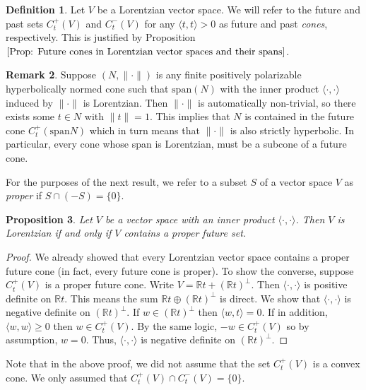 \documentclass[a4paper,11pt]{article}
\numberwithin{equation}{section}
\theoremstyle{definition}
\newtheorem{Definition}{Definition}[section]
\newtheorem{Remark}[Definition]{Remark}
\theoremstyle{plain}
\newtheorem{Proposition}[Definition]{Proposition}
\newcommand{\R}{\mathbb R}
\newcommand{\spn}{\mathrm{span}}
\newcommand{\inner}[2]{\langle #1, #2 \rangle}
\newcommand{\norm}[1]{\| #1\|}
\begin{document}
\begin{Definition}
    Let $V$ be a Lorentzian vector space. We will refer to the future and past sets $C^{+}_t(V)$ and $C^{-}_{t}(V)$ for any $\inner{t}{t} > 0$ as future and past \textit{cones}, respectively. This is justified by Proposition $\ref{Prop: Future cones in Lorentzian vector spaces and their spans}$.
\end{Definition}

\begin{Remark}
    Suppose $(N, \norm{\cdot})$ is any finite positively polarizable hyperbolically normed cone such that $\spn(N)$ with the inner product $\inner{\cdot}{\cdot}$ induced by $\norm{\cdot}$ is Lorentzian. Then $\norm{\cdot}$ is automatically non-trivial, so there exists some $t \in N$ with $\norm{t} = 1$. This implies that $N$ is contained in the future cone $C_{t}^{+}(\spn N)$ which in turn means that $\norm{\cdot}$ is also strictly hyperbolic. In particular, every cone whose span is Lorentzian, must be a subcone of a future cone.
\end{Remark}

For the purposes of the next result, we refer to a subset $S$ of a vector space $V$ as \textit{proper} if $S \cap (-S) = \{0\}$.

\begin{Proposition}
\label{Theorem: proper implies Lorentz}
    Let $V$ be a vector space with an inner product $\inner{\cdot}{\cdot}$. Then $V$ is Lorentzian if and only if $V$ contains a proper future set.
\end{Proposition}
\begin{proof}
    We already showed that every Lorentzian vector space contains a proper future cone (in fact, every future cone is proper). To show the converse, suppose $C_{t}^{+}(V)$ is a proper future cone. Write $V = \R t + (\R t)^{\perp}$. Then $\inner{\cdot}{\cdot}$ is positive definite on $\R t$. This means the sum $ \R t \oplus (\R t)^{\perp}$ is direct. We show that $\inner{\cdot}{\cdot}$ is negative definite on $(\R t)^{\perp}$. If $w \in (\R t)^{\perp}$ then $\inner{w}{t} = 0$. If in addition, $\inner{w}{w} \geq 0$ then $w \in C_{t}^{+}(V)$. By the same logic, $-w \in C_{t}^{+}(V)$ so by assumption, $w = 0$. Thus, $\inner{\cdot}{\cdot}$ is negative definite on $(\R t)^{\perp}$.
\end{proof}

Note that in the above proof, we did not assume that the set $C_{t}^{+}(V)$ is a convex cone. We only assumed that $C_{t}^{+}(V) \cap C_{t}^{-}(V) = \{0\}$.
\end{document}
